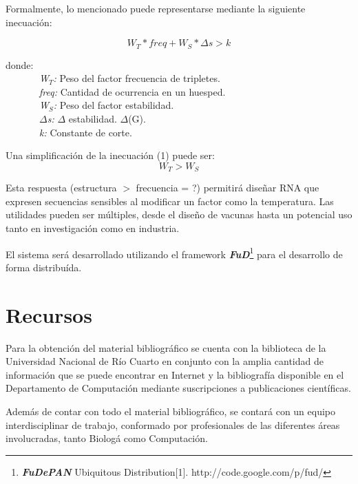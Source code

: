 \documentclass[12pt,a4paper]{article}
\begin{document}
\par Formalmente, lo mencionado puede representarse mediante la siguiente inecuación:

\begin{equation} 
W_T * freq + W_S * \Delta s > k 
\end{equation}
\begin{flushleft}
donde: \\
\ \ \ \ \ \ \ \textit{W$_T$:} Peso del factor frecuencia de tripletes.\\
\ \ \ \ \ \ \ \textit{freq:} Cantidad de ocurrencia en un huesped.\\
\ \ \ \ \ \ \ \textit{W$_S$:} Peso del factor estabilidad. \\
\ \ \ \ \ \ \ \textit{$\Delta$s:} $\Delta$ estabilidad. $\Delta$(G).\\
\ \ \ \ \ \ \ \textit{k:} Constante de corte.
\end{flushleft}
Una simplificación de la inecuación (1) puede ser: \\
\begin{displaymath}
W_T > W_S               
\end{displaymath}

\par Esta respuesta (estructura $>$ frecuencia = ?) permitirá diseñar RNA que expresen secuencias sensibles al modificar un factor como la temperatura. Las utilidades pueden ser múltiples, desde el diseño de vacunas hasta un potencial uso tanto en investigación como en industria.	

\par El sistema será desarrollado utilizando el framework \textbf{\textit{FuD}}\footnote{\textbf{\textit{FuDePAN}} Ubiquitous Distribution[1]. http://code.google.com/p/fud/} para el desarrollo de forma distribuída.

\section{Recursos}

\par Para la obtención del material bibliográfico se cuenta con la biblioteca de la Universidad Nacional de Río Cuarto en conjunto con la amplia cantidad de información que se puede encontrar en Internet y la bibliografía disponible en el Departamento de Computación mediante suscripciones a publicaciones científicas.

\par Además de contar con todo el material bibliográfico, se contará con un equipo interdisciplinar de trabajo, conformado por profesionales de las diferentes áreas involucradas, tanto Biolog\'a como Computaci\'on. 
\end{document}
